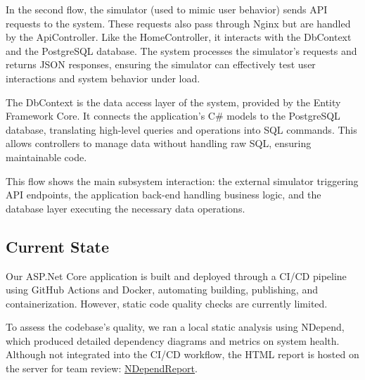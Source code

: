 \documentclass[12pt,a4paper,reqno]{report}
\begin{document}
In the second flow, the simulator (used to mimic user behavior) sends API requests to the system. These requests also pass through Nginx but are handled by the ApiController. Like the HomeController, it interacts with the DbContext and the PostgreSQL database. The system processes the simulator’s requests and returns JSON responses, ensuring the simulator can effectively test user interactions and system behavior under load.

The DbContext is the data access layer of the system, provided by the Entity Framework Core. It connects the application’s C\# models to the PostgreSQL database, translating high-level queries and operations into SQL commands. This allows controllers to manage data without handling raw SQL, ensuring maintainable code.

This flow shows the main subsystem interaction: the external simulator triggering API endpoints, the application back-end handling business logic, and the database layer executing the necessary data operations.

\subsection{Current State}

Our ASP.Net Core application is built and deployed through a CI/CD pipeline using GitHub Actions and Docker, automating building, publishing, and containerization. However, static code quality checks are currently limited.

To assess the codebase’s quality, we ran a local static analysis using NDepend, which produced detailed dependency diagrams and metrics on system health. Although not integrated into the CI/CD workflow, the HTML report is hosted on the server for team review: \href{http://67.207.72.20:8081/NDependReport.html#Main}{NDependReport}.
\end{document}
